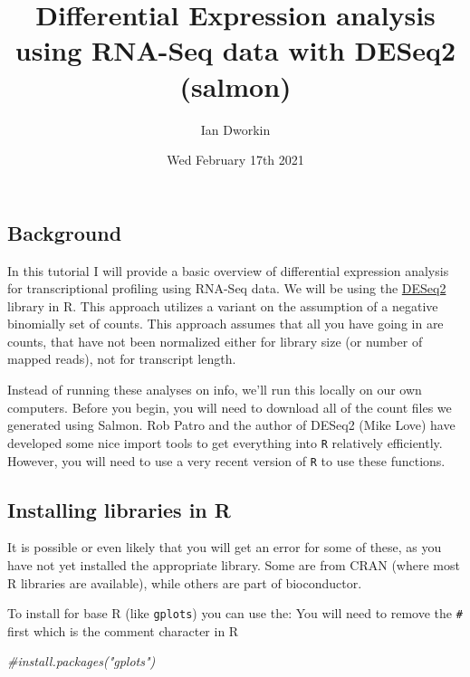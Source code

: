 \documentclass[
]{article}
\title{Differential Expression analysis using RNA-Seq data with DESeq2 (salmon)}
\author{Ian Dworkin}
\date{Wed February 17th 2021}
\newenvironment{Shaded}{\begin{snugshade}}{\end{snugshade}}
\newcommand{\CommentTok}[1]{\textcolor[rgb]{0.56,0.35,0.01}{\textit{#1}}}
\begin{document}
\maketitle

{
\setcounter{tocdepth}{2}
\tableofcontents
}
\hypertarget{background}{%
\subsection{Background}\label{background}}

In this tutorial I will provide a basic overview of differential
expression analysis for transcriptional profiling using RNA-Seq data. We
will be using the
\href{https://bioconductor.org/packages/release/bioc/html/DESeq2.html}{DESeq2}
library in R. This approach utilizes a variant on the assumption of a
negative binomially set of counts. This approach assumes that all you
have going in are counts, that have not been normalized either for
library size (or number of mapped reads), not for transcript length.

Instead of running these analyses on info, we'll run this locally on our
own computers. Before you begin, you will need to download all of the
count files we generated using Salmon. Rob Patro and the author of
DESeq2 (Mike Love) have developed some nice import tools to get
everything into \texttt{R} relatively efficiently. However, you will
need to use a very recent version of \texttt{R} to use these functions.

\hypertarget{installing-libraries-in-r}{%
\subsection{Installing libraries in R}\label{installing-libraries-in-r}}

It is possible or even likely that you will get an error for some of
these, as you have not yet installed the appropriate library. Some are
from CRAN (where most R libraries are available), while others are part
of bioconductor.

To install for base R (like \texttt{gplots}) you can use the: You will
need to remove the \texttt{\#} first which is the comment character in R

\begin{Shaded}
\begin{Highlighting}[]
\CommentTok{#install.packages("gplots")}
\end{Highlighting}
\end{Shaded}
\end{document}
